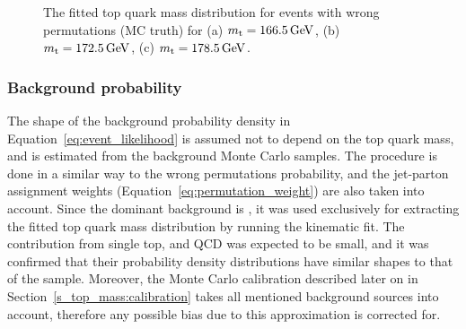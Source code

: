 \begin{figure}[!htpb]
	\centering
	\hfill
	\caption{\label{fig:fitted_ttbar_wp_density}
	The fitted top quark mass distribution for \ttbar events with wrong permutations (MC truth) for (a)
	$\mtop=\SI{166.5}{\GeV}$, (b) $\mtop=\SI{172.5}{\GeV}$, (c) $\mtop=\SI{178.5}{\GeV}$.}
\end{figure}

\subsubsection*{Background probability}

The shape of the background probability density in Equation~\ref{eq:event_likelihood} is assumed not to depend on the
top quark mass, and is estimated from the background Monte Carlo samples. The procedure is done in a similar way to the
wrong permutations probability, and the jet-parton assignment weights (Equation~\ref{eq:permutation_weight}) are also
taken into account. Since the dominant background is \WpJets, it was used exclusively for extracting the fitted top
quark mass distribution by running the kinematic fit. The contribution from single top, \ZpJets and QCD was expected to
be small, and it was confirmed that their probability density distributions have similar shapes to that of the \WpJets
sample. Moreover, the Monte Carlo calibration described later on in Section~\ref{s_top_mass:calibration} takes all
mentioned background sources into account, therefore any possible bias due to this approximation is corrected for.

